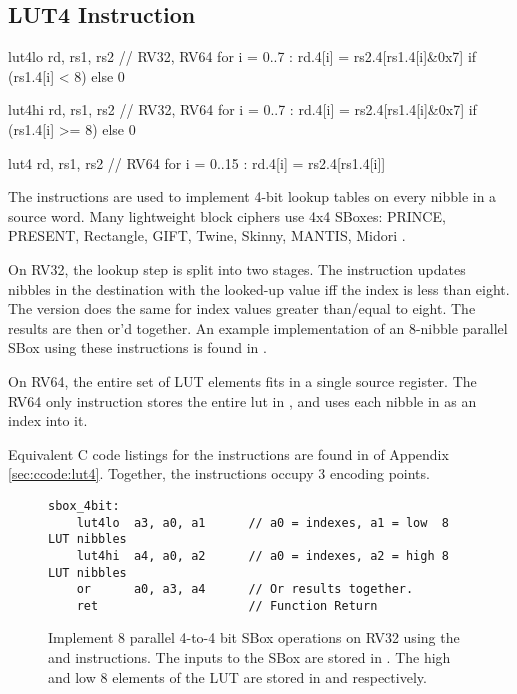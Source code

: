 

\subsection{LUT4 Instruction}

\begin{cryptoisa}
lut4lo  rd, rs1, rs2    // RV32, RV64
    for i = 0..7 : rd.4[i] = rs2.4[rs1.4[i]&0x7] if (rs1.4[i] <  8) else 0

lut4hi  rd, rs1, rs2    // RV32, RV64
    for i = 0..7 : rd.4[i] = rs2.4[rs1.4[i]&0x7] if (rs1.4[i] >= 8) else 0

lut4    rd, rs1, rs2    //       RV64
    for i = 0..15 : rd.4[i] = rs2.4[rs1.4[i]]
\end{cryptoisa}

The  instructions are used to implement 4-bit lookup tables
on every nibble in a source word.
Many lightweight block ciphers use 4x4 SBoxes:
PRINCE\cite{block:prince},
PRESENT\cite{block:present},
Rectangle\cite{block:rectangle},
GIFT\cite{block:gift},
Twine\cite{block:twine},
Skinny, MANTIS\cite{block:skinny},
Midori \cite{block:midori}.

On RV32, the lookup step is split into two stages.
The  instruction
updates nibbles in the destination with the looked-up value
iff the index is less than eight.
The  version does
the same for index values greater than/equal to eight.
The results are then or'd together.
An example implementation of an $8$-nibble parallel SBox using these
instructions is found in .

On RV64, the entire set of LUT elements fits in a single source register.
The RV64 only  instruction stores the entire lut in
\rstwo, and uses each nibble in \rsone as an index into it.

Equivalent C code listings for the instructions are found in
 of Appendix \ref{sec:ccode:lut4}.
Together, the instructions occupy $3$ encoding points.

\begin{figure}[h]
\begin{lstlisting}[style=ASM]
sbox_4bit:
    lut4lo  a3, a0, a1      // a0 = indexes, a1 = low  8 LUT nibbles
    lut4hi  a4, a0, a2      // a0 = indexes, a2 = high 8 LUT nibbles
    or      a0, a3, a4      // Or results together.
    ret                     // Function Return
\end{lstlisting}
\caption{
    Implement 8 parallel 4-to-4 bit SBox operations on RV32 using
    the  and  instructions.
    The inputs to the SBox are stored in .
    The high and low $8$ elements of the
    LUT are stored in  and  respectively.
}
\label{fig:example:lut4:1}
\end{figure}

